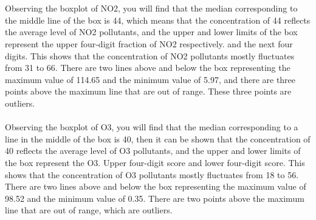 \documentclass[a4paper,11pt,reqno]{report}
\begin{document}
\\
\\
Observing the boxplot of NO2, you will find that the median corresponding to the middle line of the box is 44, which means that the concentration of 44 reflects the average level of NO2 pollutants, and the upper and lower limits of the box represent the upper four-digit fraction of NO2 respectively. and the next four digits. This shows that the concentration of NO2 pollutants mostly fluctuates from 31 to 66. There are two lines above and below the box representing the maximum value of 114.65 and the minimum value of 5.97, and there are three points above the maximum line that are out of range. These three points are outliers.
\\
\\
Observing the boxplot of O3, you will find that the median corresponding to a line in the middle of the box is 40, then it can be shown that the concentration of 40 reflects the average level of O3 pollutants, and the upper and lower limits of the box represent the O3. Upper four-digit score and lower four-digit score. This shows that the concentration of O3 pollutants mostly fluctuates from 18 to 56. There are two lines above and below the box representing the maximum value of 98.52 and the minimum value of 0.35. There are two points above the maximum line that are out of range, which are outliers.


\end{document}
